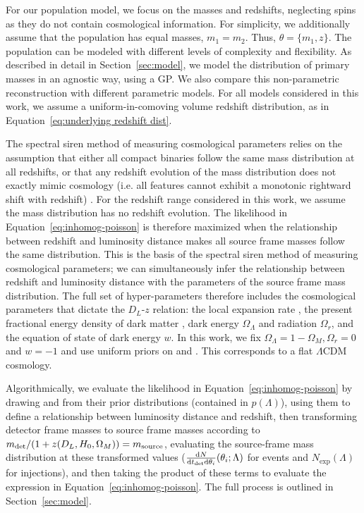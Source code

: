 \documentclass[]{aastex631}
\begin{document}
For our population model, we focus on the masses and redshifts, neglecting spins as they do not contain cosmological information.
For simplicity, we additionally assume that the population has equal masses, $m_1=m_2$.
Thus, $\theta = \{m_1,z\}$. 
The population can be modeled with different levels of complexity and flexibility. 
As described in detail in Section~\ref{sec:model}, we model the distribution of primary masses in an agnostic way, using a \acl{GP}. 
We also compare this non-parametric reconstruction with different parametric models.  
For all models considered in this work, we assume a uniform-in-comoving volume redshift distribution, as in Equation~\ref{eq:underlying redshift dist}.

The spectral siren method of measuring cosmological parameters relies on the assumption that either all compact binaries follow the same mass distribution at all redshifts, or that any redshift evolution of the mass distribution does  not exactly mimic cosmology (i.e. all features cannot exhibit a monotonic rightward shift with redshift) \citep{ezquiaga_spectral_2022}. For the redshift range considered in this work, we assume the mass distribution has no redshift evolution.
The likelihood in Equation~\ref{eq:inhomog-poisson} is therefore maximized when the relationship between redshift and luminosity distance makes all source frame masses follow the same distribution.
This is the basis of the spectral siren method of measuring cosmological parameters; we can simultaneously infer the relationship between redshift and luminosity distance with the parameters of the source frame mass distribution.
The full set of hyper-parameters therefore includes the cosmological parameters that dictate the $D_L$-$z$ relation: the local expansion rate \Ho, the present fractional energy density of dark matter \Omm, dark energy $\Omega_\Lambda$ and radiation $\Omega_r$, and the equation of state of dark energy $w$.
In this work, we fix $\Omega_\Lambda=1-\Omega_M, \Omega_r=0$ and $w=-1$ and use uniform priors on \Ho{} and \Omm{}. 
This corresponds to a flat $\Lambda$CDM cosmology.

Algorithmically, we evaluate the likelihood in Equation~\ref{eq:inhomog-poisson} by drawing \Ho{} and \Omm{} from their prior distributions (contained in $p(\Lambda)$), using them to define a relationship between luminosity distance and redshift, then transforming detector frame masses to source frame masses according to $m_{\det} /(1+z(D_L,H_0,\Omega_M)) = m_{\text{source}}$, evaluating the source-frame mass distribution at these transformed values ($\frac{\text{d} N}{\text{d} t_{\det} \text{d} \theta_i} (\theta_i;\Lambda)$ for events and $N_{\text{exp}}(\Lambda)$ for injections), and then taking the product of these terms to evaluate the expression in Equation~\ref{eq:inhomog-poisson}.
The full process is outlined in Section~\ref{sec:model}.
\end{document}

